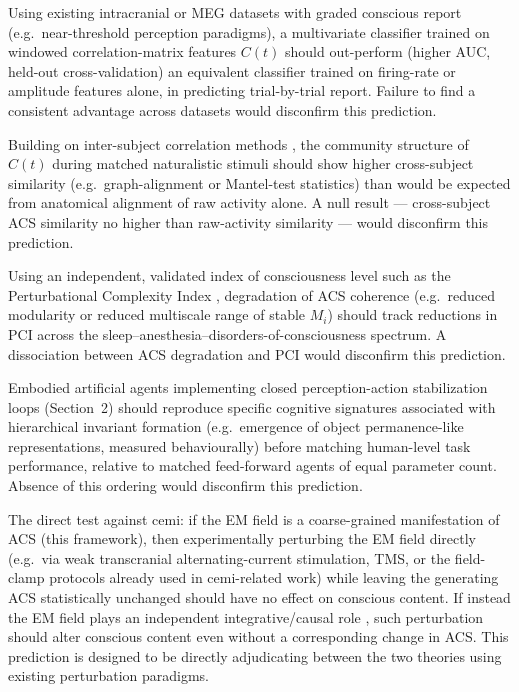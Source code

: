 \documentclass[11pt]{article}
\begin{document}
\begin{description}[leftmargin=1.2cm,style=nextline]
\item[P1 (ACS over firing rate)] Using existing intracranial or MEG datasets with graded conscious report (e.g.\ near-threshold perception paradigms), a multivariate classifier trained on windowed correlation-matrix features $C(t)$ should out-perform (higher AUC, held-out cross-validation) an equivalent classifier trained on firing-rate or amplitude features alone, in predicting trial-by-trial report. Failure to find a consistent advantage across datasets would disconfirm this prediction.

\item[P2 (convergent organization across individuals)] Building on inter-subject correlation methods \citep*{hasson2004}, the community structure of $C(t)$ during matched naturalistic stimuli should show higher cross-subject similarity (e.g.\ graph-alignment or Mantel-test statistics) than would be expected from anatomical alignment of raw activity alone. A null result --- cross-subject ACS similarity no higher than raw-activity similarity --- would disconfirm this prediction.

\item[P3 (graded organization tracks graded phenomenology)] Using an independent, validated index of consciousness level such as the Perturbational Complexity Index \citep*{casali2013}, degradation of ACS coherence (e.g.\ reduced modularity or reduced multiscale range of stable $M_i$) should track reductions in PCI across the sleep--anesthesia--disorders-of-consciousness spectrum. A dissociation between ACS degradation and PCI would disconfirm this prediction.

\item[P4 (artificial embodied agents)] Embodied artificial agents implementing closed perception-action stabilization loops (Section~2) should reproduce specific cognitive signatures associated with hierarchical invariant formation (e.g.\ emergence of object permanence-like representations, measured behaviourally) before matching human-level task performance, relative to matched feed-forward agents of equal parameter count. Absence of this ordering would disconfirm this prediction.

\item[P5 (EM field as manifestation, not substrate)] The direct test against cemi: if the EM field is a coarse-grained manifestation of ACS (this framework), then experimentally perturbing the EM field directly (e.g.\ via weak transcranial alternating-current stimulation, TMS, or the field-clamp protocols already used in cemi-related work) while leaving the generating ACS statistically unchanged should have no effect on conscious content. If instead the EM field plays an independent integrative/causal role \citep*{mcfadden2002a,mcfadden2020}, such perturbation should alter conscious content even without a corresponding change in ACS. This prediction is designed to be directly adjudicating between the two theories using existing perturbation paradigms.
\end{description}
\end{document}
